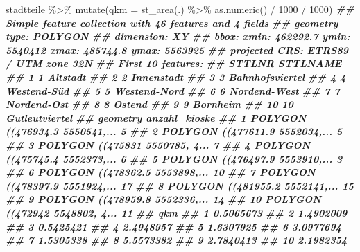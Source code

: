 \documentclass[11pt,german,a4paper]{article}
\newenvironment{Shaded}{\begin{snugshade}}{\end{snugshade}}
\newcommand{\AttributeTok}[1]{\textcolor[rgb]{0.77,0.63,0.00}{#1}}
\newcommand{\DecValTok}[1]{\textcolor[rgb]{0.00,0.00,0.81}{#1}}
\newcommand{\DocumentationTok}[1]{\textcolor[rgb]{0.56,0.35,0.01}{\textbf{\textit{#1}}}}
\newcommand{\FunctionTok}[1]{\textcolor[rgb]{0.00,0.00,0.00}{#1}}
\newcommand{\NormalTok}[1]{#1}
\newcommand{\SpecialCharTok}[1]{\textcolor[rgb]{0.00,0.00,0.00}{#1}}
\begin{document}
\begin{Shaded}
\begin{Highlighting}[]
\NormalTok{stadtteile }\SpecialCharTok{\%\textgreater{}\%}
  \FunctionTok{mutate}\NormalTok{(}\AttributeTok{qkm =} \FunctionTok{st\_area}\NormalTok{(.) }\SpecialCharTok{\%\textgreater{}\%} \FunctionTok{as.numeric}\NormalTok{() }\SpecialCharTok{/} \DecValTok{1000} \SpecialCharTok{/} \DecValTok{1000}\NormalTok{)}
\DocumentationTok{\#\# Simple feature collection with 46 features and 4 fields}
\DocumentationTok{\#\# geometry type:  POLYGON}
\DocumentationTok{\#\# dimension:      XY}
\DocumentationTok{\#\# bbox:           xmin: 462292.7 ymin: 5540412 xmax: 485744.8 ymax: 5563925}
\DocumentationTok{\#\# projected CRS:  ETRS89 / UTM zone 32N}
\DocumentationTok{\#\# First 10 features:}
\DocumentationTok{\#\#    STTLNR        STTLNAME}
\DocumentationTok{\#\# 1       1        Altstadt}
\DocumentationTok{\#\# 2       2      Innenstadt}
\DocumentationTok{\#\# 3       3 Bahnhofsviertel}
\DocumentationTok{\#\# 4       4     Westend{-}Süd}
\DocumentationTok{\#\# 5       5    Westend{-}Nord}
\DocumentationTok{\#\# 6       6    Nordend{-}West}
\DocumentationTok{\#\# 7       7     Nordend{-}Ost}
\DocumentationTok{\#\# 8       8          Ostend}
\DocumentationTok{\#\# 9       9        Bornheim}
\DocumentationTok{\#\# 10     10  Gutleutviertel}
\DocumentationTok{\#\#                          geometry anzahl\_kioske}
\DocumentationTok{\#\# 1  POLYGON ((476934.3 5550541,...             5}
\DocumentationTok{\#\# 2  POLYGON ((477611.9 5552034,...             5}
\DocumentationTok{\#\# 3  POLYGON ((475831 5550785, 4...             7}
\DocumentationTok{\#\# 4  POLYGON ((475745.4 5552373,...             6}
\DocumentationTok{\#\# 5  POLYGON ((476497.9 5553910,...             3}
\DocumentationTok{\#\# 6  POLYGON ((478362.5 5553898,...            10}
\DocumentationTok{\#\# 7  POLYGON ((478397.9 5551924,...            17}
\DocumentationTok{\#\# 8  POLYGON ((481955.2 5552141,...            15}
\DocumentationTok{\#\# 9  POLYGON ((478959.8 5552336,...            14}
\DocumentationTok{\#\# 10 POLYGON ((472942 5548802, 4...            11}
\DocumentationTok{\#\#          qkm}
\DocumentationTok{\#\# 1  0.5065673}
\DocumentationTok{\#\# 2  1.4902009}
\DocumentationTok{\#\# 3  0.5425421}
\DocumentationTok{\#\# 4  2.4948957}
\DocumentationTok{\#\# 5  1.6307925}
\DocumentationTok{\#\# 6  3.0977694}
\DocumentationTok{\#\# 7  1.5305338}
\DocumentationTok{\#\# 8  5.5573382}
\DocumentationTok{\#\# 9  2.7840413}
\DocumentationTok{\#\# 10 2.1982354}
\end{Highlighting}
\end{Shaded}
\end{document}
